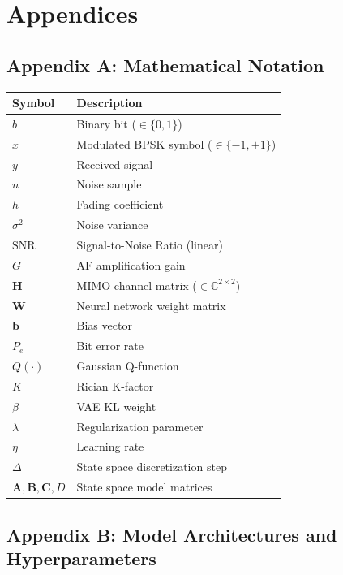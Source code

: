 \chapter{Appendices}\label{sec:appendices}

\section{Appendix A: Mathematical Notation}\label{sec:appendix-a-mathematical-notation}

{\def\LTcaptype{table} %
\begin{longtable}[]{@{}ll@{}}
\toprule\noalign{}
Symbol & Description \\
\midrule\noalign{}
\endhead
\bottomrule\noalign{}
\endlastfoot
\(b\) & Binary bit (\(\in \{0, 1\}\)) \\
\(x\) & Modulated BPSK symbol (\(\in \{-1, +1\}\)) \\
\(y\) & Received signal \\
\(n\) & Noise sample \\
\(h\) & Fading coefficient \\
\(\sigma^2\) & Noise variance \\
\(\text{SNR}\) & Signal-to-Noise Ratio (linear) \\
\(G\) & AF amplification gain \\
\(\mathbf{H}\) & MIMO channel matrix (\(\in \mathbb{C}^{2 \times 2}\)) \\
\(\mathbf{W}\) & Neural network weight matrix \\
\(\mathbf{b}\) & Bias vector \\
\(P_e\) & Bit error rate \\
\(Q(\cdot)\) & Gaussian Q-function \\
\(K\) & Rician K-factor \\
\(\beta\) & VAE KL weight \\
\(\lambda\) & Regularization parameter \\
\(\eta\) & Learning rate \\
\(\Delta\) & State space discretization step \\
\(\mathbf{A}, \mathbf{B}, \mathbf{C}, D\) & State space model matrices \\
\end{longtable}
}

\section{Appendix B: Model Architectures and Hyperparameters}\label{sec:appendix-b-model-architectures-and-hyperparameters}

